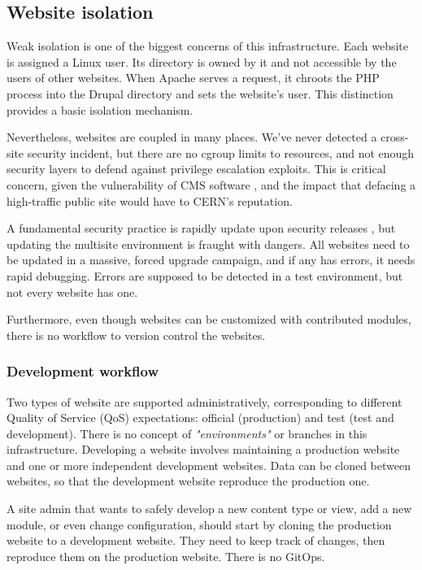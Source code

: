 \subsection{Website isolation}

Weak isolation is one of the biggest concerns of this infrastructure.
Each website is assigned a Linux user.
Its directory is owned by it and not accessible by the users of other websites.
When Apache serves a request, it chroots the PHP process into the Drupal directory and sets the website's user.
This distinction provides a basic isolation mechanism.

Nevertheless, websites are coupled in many places.
We've never detected a cross-site security incident,
but there are no cgroup limits to resources, and not enough security layers to defend against privilege escalation exploits.
This is critical concern, given the vulnerability of CMS software \cite{shteiman_why_2014},
and the impact that defacing a high-traffic public site would have to CERN's reputation.

A fundamental security practice is rapidly update upon security releases \cite{csontos_accessibility_2020},
but updating the multisite environment is fraught with dangers.
All websites need to be updated in a massive, forced upgrade campaign, and if any has errors, it needs rapid debugging.
Errors are supposed to be detected in a test environment, but not every website has one.

Furthermore, even though websites can be customized with contributed modules, there is no workflow to version control the websites.

\subsubsection*{Development workflow}

Two types of website are supported administratively, corresponding to different Quality of Service (QoS) expectations: official (production) and test (test and development).
There is no concept of \emph{"environments"} or branches in this infrastructure. Developing a website involves maintaining a production website and one or more independent development websites.
Data can be cloned between websites, so that the development website reproduce the production one.

A site admin that wants to safely develop a new content type or view, add a new module, or even change configuration, should start by cloning the production website to a development website.
They need to keep track of changes, then reproduce them on the production website.
There is no GitOps.

